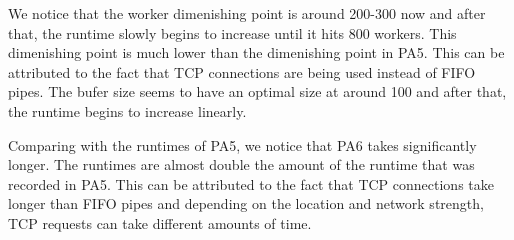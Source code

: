 \documentclass[12pt]{article}
\begin{document}
We notice that the worker dimenishing point is around 200-300 now and after that, the runtime slowly begins to increase until it hits 800 workers. This dimenishing point is much lower than the dimenishing point in PA5. This can be attributed to the fact that TCP connections are being used instead of FIFO pipes. The bufer size seems to have an optimal size at around 100 and after that, the runtime begins to increase linearly. 

Comparing with the runtimes of PA5, we notice that PA6 takes significantly longer. The runtimes are almost double the amount of the runtime that was recorded in PA5. This can be attributed to the fact that TCP connections take longer than FIFO pipes and depending on the location and network strength, TCP requests can take different amounts of time. 
\end{document}
